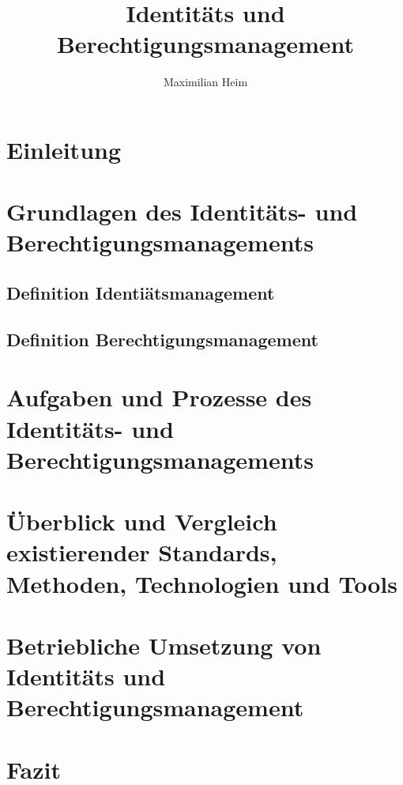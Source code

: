 \documentclass[10pt]{article}
\author{Maximilian Heim}
\title{Identitäts und Berechtigungsmanagement}
\begin{document}
\maketitle
\newpage
\tableofcontents
\newpage
\section{Einleitung}
\section{Grundlagen des Identitäts- und Berechtigungsmanagements}
\subsection{Definition Identiätsmanagement}
\subsection{Definition Berechtigungsmanagement}
\section{Aufgaben und Prozesse des Identitäts- und Berechtigungsmanagements}
\section{Überblick und Vergleich existierender Standards, Methoden, Technologien und Tools}
\section{Betriebliche Umsetzung von Identitäts und Berechtigungsmanagement}
\section{Fazit}
\end{document}
